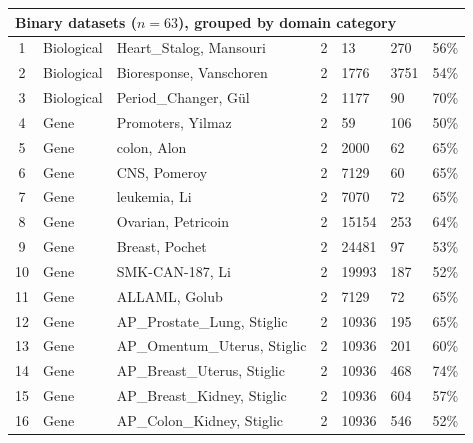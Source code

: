 \documentclass[preprint,12pt,authoryear]{elsarticle}
\begin{document}
{{\begin{longtable}{|c|p{1.9cm}|p{6.7cm}|c|p{0.75cm}|p{0.75cm}|p{0.75cm}|}
\multicolumn{7}{|l|}{\textbf{Binary datasets ($n=63$), grouped by domain category}} \\
\hline
1  & Biological & Heart\_Stalog, Mansouri \citeyearpar{statlog_heart_145}         & 2 & 13    & 270   & 56\% \\
2  & Biological & Bioresponse, Vanschoren \citeyearpar{vanschoren2014openml}           & 2 & 1776  & 3751  & 54\% \\
3  & Biological & Period\_Changer, G{\"u}l \citeyearpar{period_changer_729}         & 2 & 1177  & 90    & 70\% \\ \hline
4  & Gene       & Promoters, Yilmaz \citeyearpar{yilmaz2023mucsteri}               & 2 & 59    & 106   & 50\% \\
5  & Gene       & colon, Alon \citeyearpar{alon1999broad}                        & 2 & 2000  & 62    & 65\% \\
6  & Gene       & CNS, Pomeroy \citeyearpar{pomeroy2002prediction}                  & 2 & 7129  & 60    & 65\% \\
7  & Gene       & leukemia, Li \citeyearpar{li2017feature}                     & 2 & 7070  & 72    & 65\% \\
8  & Gene       & Ovarian, Petricoin \citeyearpar{petricoin2002use}                   & 2 & 15154 & 253   & 64\% \\
9  & Gene       & Breast, Pochet \citeyearpar{pochet2004systematic}                & 2 & 24481 & 97    & 53\% \\
10 & Gene       & SMK-CAN-187, Li \citeyearpar{li2017feature}                  & 2 & 19993 & 187   & 52\% \\
11 & Gene       & ALLAML, Golub \citeyearpar{golub1999molecular}                  & 2 & 7129  & 72    & 65\% \\
12 & Gene       & AP\_Prostate\_Lung, Stiglic \citeyearpar{stiglic2010stability}    & 2 & 10936 & 195   & 65\% \\
13 & Gene       & AP\_Omentum\_Uterus, Stiglic \citeyearpar{stiglic2010stability}   & 2 & 10936 & 201   & 60\% \\
14 & Gene       & AP\_Breast\_Uterus, Stiglic \citeyearpar{stiglic2010stability}    & 2 & 10936 & 468   & 74\% \\
15 & Gene       & AP\_Breast\_Kidney, Stiglic \citeyearpar{stiglic2010stability}    & 2 & 10936 & 604   & 57\% \\
16 & Gene       & AP\_Colon\_Kidney, Stiglic \citeyearpar{stiglic2010stability}     & 2 & 10936 & 546   & 52\% \\

\end{longtable}}}
\end{document}
